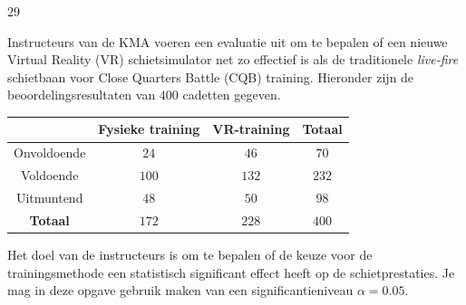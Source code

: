 \begin{question}{29}{
    Instructeurs van de KMA voeren een evaluatie uit om te bepalen of een nieuwe Virtual Reality (VR) schietsimulator net zo effectief is als de traditionele \emph{live-fire} schietbaan voor Close Quarters Battle (CQB) training.
    Hieronder zijn de beoordelingsresultaten van $400$ cadetten gegeven.
    \par\medskip
    \begin{center}
        \renewcommand{\arraystretch}{1}
        \begin{tabular}{cccc}
            \toprule
                & \textbf{Fysieke training} & \textbf{VR-training} & \textbf{Totaal} \\
            \midrule
                Onvoldoende & $24$ & $46$ & $70$  \\
                Voldoende   & $100$ & $132$ & $232$  \\
                Uitmuntend  & $48$ & $50$ & $98$  \\
            \midrule
                \textbf{Totaal} & $172$ & $228$ & $400$ \\
            \bottomrule
        \end{tabular}
    \end{center}
    \par\medskip
    Het doel van de instructeurs is om te bepalen of de keuze voor de trainingsmethode een statistisch significant effect heeft op de schietprestaties.
    Je mag in deze opgave gebruik maken van een significantieniveau $\alpha = 0.05$.
}




\end{question}
